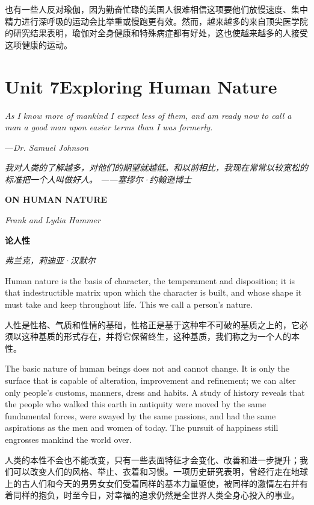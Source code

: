 \documentclass[cs4size, a4paper,12pt]{article}
\newcounter{numpar}
\newcommand*{\newpar}{\numpar{}}
\begin{document}
也有一些人反对瑜伽，因为勤奋忙碌的美国人很难相信这项要他们放慢速度、集中精力进行深呼吸的运动会比举重或慢跑更有效。然而，越来越多的来自顶尖医学院的研究结果表明，瑜伽对全身健康和特殊病症都有好处，这也使越来越多的人接受这项健康的运动。

\section*{Unit 7\qquad{}Exploring Human Nature}
\setcounter{numpar}{0}
\textit{As I know more of mankind I expect less of them, and am ready now to call a man a good man upon easier terms than I was formerly.}

\hfill\textcolor{tcolor}{---\textit{Dr. Samuel Johnson}}

\textit{我对人类的了解越多，对他们的期望就越低。和以前相比，我现在常常以较宽松的标准把一个人叫做好人。
——塞缪尔·约翰逊博士}
\begin{center}
\textcolor{tcolor}{\bf ON HUMAN NATURE}

\hfill\textit{Frank and Lydia Hammer}

\textcolor{tcolor}{\bf 论人性}

\hfill\textit{弗兰克，莉迪亚·汉默尔}
\end{center}
\newpar Human nature is the basis of character, the temperament and disposition; it is that indestructible matrix upon which the character is built, and whose shape it must take and keep throughout life. This we call a person's nature.

人性是性格、气质和性情的基础，性格正是基于这种牢不可破的基质之上的，它必须以这种基质的形式存在，并将它保留终生，这种基质，我们称之为一个人的本性。

\newpar The basic nature of human beings does not and cannot change. It is only the surface that is capable of alteration, improvement and refinement; we can alter only people's customs, manners, dress and habits. A study of history reveals that the people who walked this
earth in antiquity were moved by the same fundamental forces, were swayed by the same passions, and had the same aspirations as the men and women of today. The pursuit of happiness still engrosses mankind the world over.

人类的本性不会也不能改变，只有一些表面特征才会变化、改善和进一步提升；我们可以改变人们的风格、举止、衣着和习惯。一项历史研究表明，曾经行走在地球上的古人们和今天的男男女女们受着同样的基本力量驱使，被同样的激情左右并有着同样的抱负，时至今日，对幸福的追求仍然是全世界人类全身心投入的事业。
\end{document}

